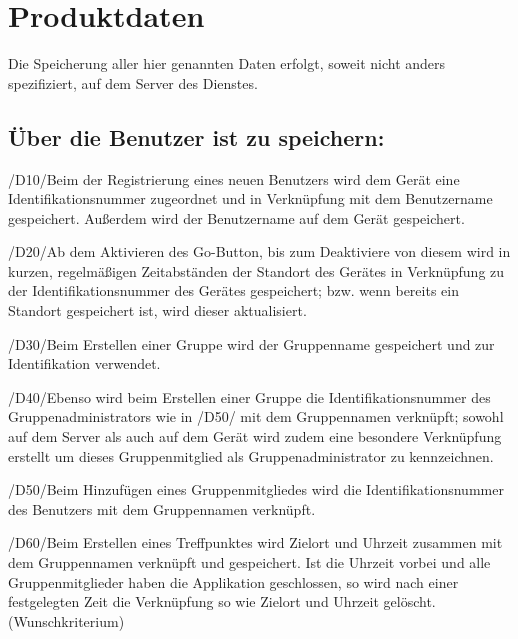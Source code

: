 \section{Produktdaten}

Die Speicherung aller hier genannten Daten erfolgt, soweit nicht anders spezifiziert, auf dem Server des Dienstes.

\subsection{Über die Benutzer ist zu speichern:}
/D10/Beim der Registrierung eines neuen Benutzers wird dem Gerät eine Identifikationsnummer zugeordnet und in Verknüpfung mit dem Benutzername gespeichert. Außerdem wird der Benutzername auf dem Gerät gespeichert.

/D20/Ab dem Aktivieren des Go-Button, bis zum Deaktiviere von diesem wird in kurzen, regelmäßigen Zeitabständen der Standort des Gerätes in Verknüpfung zu der Identifikationsnummer des Gerätes gespeichert; bzw. wenn bereits ein Standort gespeichert ist, wird dieser aktualisiert.

/D30/Beim Erstellen einer Gruppe wird der Gruppenname gespeichert und zur Identifikation verwendet.

/D40/Ebenso wird beim Erstellen einer Gruppe die Identifikationsnummer des Gruppenadministrators wie in /D50/ mit dem Gruppennamen verknüpft; sowohl auf dem Server als auch auf dem Gerät wird zudem eine besondere Verknüpfung erstellt um dieses Gruppenmitglied als Gruppenadministrator zu kennzeichnen.

/D50/Beim Hinzufügen eines Gruppenmitgliedes wird die Identifikationsnummer des Benutzers mit dem Gruppennamen verknüpft.

/D60/Beim Erstellen eines Treffpunktes wird Zielort und Uhrzeit zusammen mit dem Gruppennamen verknüpft und gespeichert. Ist die Uhrzeit vorbei und alle Gruppenmitglieder haben die Applikation geschlossen, so wird nach einer festgelegten Zeit die Verknüpfung so wie Zielort und Uhrzeit gelöscht. (Wunschkriterium)